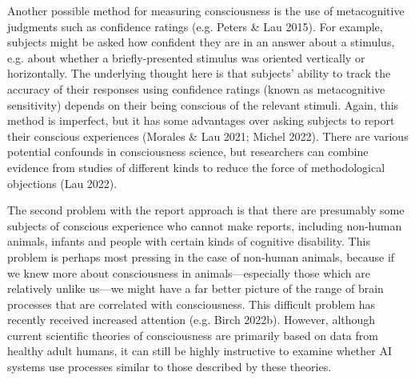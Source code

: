 \documentclass[12pt]{article}
\begin{document}
Another possible method for measuring consciousness is the use of metacognitive judgments such as confidence ratings (e.g. Peters \& Lau 2015). For example, subjects might be asked how confident they are in an answer about a stimulus, e.g. about whether a briefly-presented stimulus was oriented vertically or horizontally. The underlying thought here is that subjects’ ability to track the accuracy of their responses using confidence ratings (known as metacognitive sensitivity) depends on their being conscious of the relevant stimuli. Again, this method is imperfect, but it has some advantages over asking subjects to report their conscious experiences (Morales \& Lau 2021; Michel 2022). There are various potential confounds in consciousness science, but researchers can combine evidence from studies of different kinds to reduce the force of methodological objections (Lau 2022).

The second problem with the report approach is that there are presumably some subjects of conscious experience who cannot make reports, including non-human animals, infants and people with certain kinds of cognitive disability. This problem is perhaps most pressing in the case of non-human animals, because if we knew more about consciousness in animals—especially those which are relatively unlike us—we might have a far better picture of the range of brain processes that are correlated with consciousness. This difficult problem has recently received increased attention (e.g. Birch 2022b). However, although current scientific theories of consciousness are primarily based on data from healthy adult humans, it can still be highly instructive to examine whether AI systems use processes similar to those described by these theories.
\end{document}
